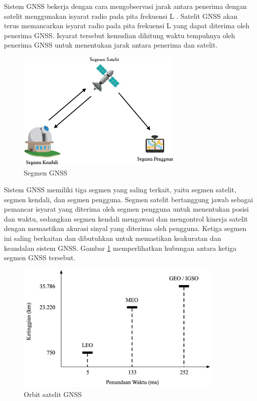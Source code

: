 Sistem GNSS bekerja dengan cara mengobservasi jarak antara penerima dengan satelit menggunakan isyarat radio pada pita frekuensi L \cite{TheEuropeanGlobalNavigationSatelliteSystemsAgency2021}. Satelit GNSS akan terus memancarkan isyarat radio pada pita frekuensi L yang dapat diterima oleh penerima GNSS. Isyarat tersebut kemudian dihitung waktu tempuhnya oleh penerima GNSS untuk menentukan jarak antara penerima dan satelit. 

\begin{figure}[H]
	\centering
	\includegraphics[width=8cm]{contents/chapter-2/gnss_segment.jpg}
	\caption{Segmen GNSS}
	\label{Fig: gnss_segment}
\end{figure}

Sistem GNSS memiliki tiga segmen yang saling terkait, yaitu segmen satelit, segmen kendali, dan segmen pengguna. Segmen satelit bertanggung jawab sebagai pemancar isyarat yang diterima oleh segmen pengguna untuk menentukan posisi dan waktu, sedangkan segmen kendali mengawasi dan mengontrol kinerja satelit dengan memastikan akurasi sinyal yang diterima oleh pengguna. Ketiga segmen ini saling berkaitan dan dibutuhkan untuk memastikan keakuratan dan keandalan sistem GNSS. Gambar \ref{Fig: gnss_segment} memperlihatkan hubungan antara ketiga segmen GNSS tersebut.

\begin{figure}[H]
	\centering
	\includegraphics[width=10cm]{contents/chapter-2/alt-comp.png}
	\caption{Orbit satelit GNSS}
	\label{Fig: alt-comp}
\end{figure}

